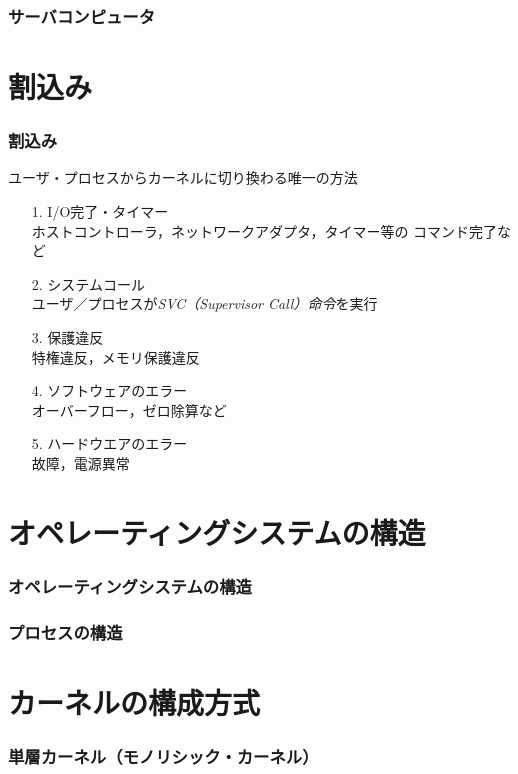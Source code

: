 \documentclass[handout]{beamer}                   %
\begin{document}
\begin{frame}
  \frametitle{サーバコンピュータ}
\end{frame}

\section{割込み}
\begin{frame}
  \frametitle{割込み}
  ユーザ・プロセスからカーネルに切り換わる唯一の方法
  \begin{enumerate}
    \item[1.] I/O完了・タイマー \\
      ホストコントローラ，ネットワークアダプタ，タイマー等の
      コマンド完了など
    \item[2.] システムコール \\
      ユーザ／プロセスが\emph{SVC（Supervisor Call）命令}を実行
    \item[3.] 保護違反 \\
      特権違反，メモリ保護違反
    \item[4.] ソフトウェアのエラー \\
      オーバーフロー，ゼロ除算など
    \item[5.] ハードウエアのエラー \\
      故障，電源異常
  \end{enumerate}
  \vfill
\end{frame}

\section{オペレーティングシステムの構造}
\begin{frame}
  \frametitle{オペレーティングシステムの構造}
\end{frame}

\begin{frame}
  \frametitle{プロセスの構造}
\end{frame}

\section{カーネルの構成方式}
\begin{frame}
  \frametitle{単層カーネル（モノリシック・カーネル）}
\end{frame}
\end{document}
